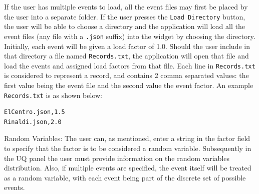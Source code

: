 If the user has multiple events to load, all the event files may first
be placed by the user into a separate folder. If the user presses the
\texttt{Load Directory} button, the user will be able to choose a directory and the
application will load all the event files (any file with a \texttt{.json}
suffix) into the widget by choosing the directory. Initially, each
event will be given a load factor of 1.0.  Should the user include in
that directory a file named \texttt{Records.txt}, the application will open that
file and load the events and assigned load factors from that
file. Each line in \texttt{Records.txt} is considered to represent a record, and
contains 2 comma separated values: the first value being the event
file and the second value the event factor. An example \texttt{Records.txt} is
as shown below:

\begin{verbatim}
ElCentro.json,1.5
Rinaldi.json,2.0
\end{verbatim}

Random Variables: The user can, as mentioned, enter a string in the
factor field to specify that the factor is to be considered a random
variable. Subsequently in the UQ panel the user must provide
information on the random variables distribution. Also, if multiple
events are specified, the event itself will be treated as a random
variable, with each event being part of the discrete set of possible
events.
